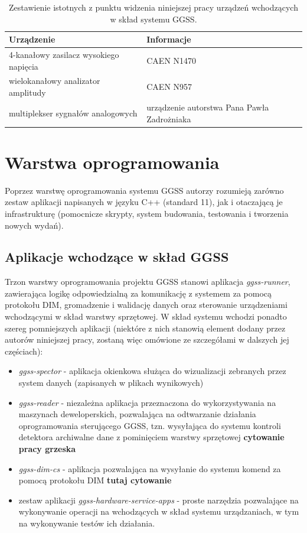 \begin{table}[htbp]
\centering
\caption{Zestawienie istotnych z punktu widzenia niniejszej pracy urządzeń wchodzących w skład systemu GGSS.}
\label{tab:devices}
\begin{tabularx}{\textwidth}{@{}XX@{}}
\toprule
Urządzenie &
Informacje \\
\midrule
4-kanałowy zasilacz wysokiego napięcia & CAEN N1470 \\
wielokanałowy analizator amplitudy & CAEN N957 \\
multiplekser sygnałów analogowych & urządzenie autorstwa Pana Pawła Zadrożniaka\\
\bottomrule
\end{tabularx}
\end{table}


\section{Warstwa oprogramowania}
Poprzez warstwę oprogramowania systemu GGSS autorzy rozumieją zarówno zestaw aplikacji napisanych w języku C++ (standard 11), jak i otaczającą je infrastrukturę (pomocnicze skrypty, system budowania, testowania i tworzenia nowych wydań). 



\subsection{Aplikacje wchodzące w skład GGSS}
Trzon warstwy oprogramowania projektu GGSS stanowi aplikacja \emph{ggss-runner}, zawierająca logikę odpowiedzialną za komunikację z systemem za pomocą protokołu DIM, gromadzenie i walidację danych oraz sterowanie urządzeniami wchodzącymi w skład warstwy sprzętowej. W skład systemu wchodzi ponadto szereg pomniejszych aplikacji (niektóre z nich stanowią element dodany przez autorów niniejszej pracy, zostaną więc omówione ze szczegółami w dalszych jej częściach):
\begin{itemize}
    \item \emph{ggss-spector} - aplikacja okienkowa służąca do wizualizacji zebranych przez system danych (zapisanych w plikach wynikowych)
    \item \emph{ggss-reader} - niezależna aplikacja przeznaczona do wykorzystywania na maszynach deweloperskich, pozwalająca na odtwarzanie działania oprogramowania sterującego GGSS, tzn. wysyłająca do systemu kontroli detektora archiwalne dane z pominięciem warstwy sprzętowej \textbf{cytowanie pracy grzeska}
    \item \emph{ggss-dim-cs} - aplikacja pozwalająca na wysyłanie do systemu komend za pomocą protokołu DIM \textbf{tutaj cytowanie}
    \item zestaw aplikacji \emph{ggss-hardware-service-apps} - proste narzędzia pozwalające na wykonywanie operacji na wchodzących w skład systemu urządzaniach, w tym na wykonywanie testów ich działania. 
\end{itemize}


